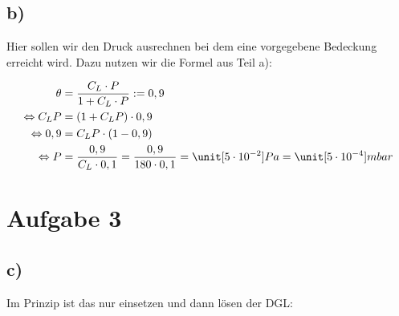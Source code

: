 \newpage

\subsection*{b)}

Hier sollen wir den Druck ausrechnen bei dem eine vorgegebene Bedeckung erreicht wird. Dazu nutzen wir die Formel aus Teil a):

\begin{align*}
\theta &= \frac{C_L \cdot P}{1 + C_L \cdot P} := 0,9 \\
\Leftrightarrow C_L P &= \left( 1 + C_L P \right) \cdot 0,9 \\
\Leftrightarrow 0,9 &= C_L P \cdot \left( 1 - 0,9 \right) \\
\Leftrightarrow P &= \frac{0,9}{C_L \cdot 0,1} = \frac{0,9}{180 \cdot 0,1} = \unit[5 \cdot 10^{-2}]{Pa} = \unit[5 \cdot 10^{-4}]{mbar}
\end{align*}


\section{Aufgabe 3}

\subsection*{c)}

Im Prinzip ist das nur einsetzen und dann lösen der DGL:


